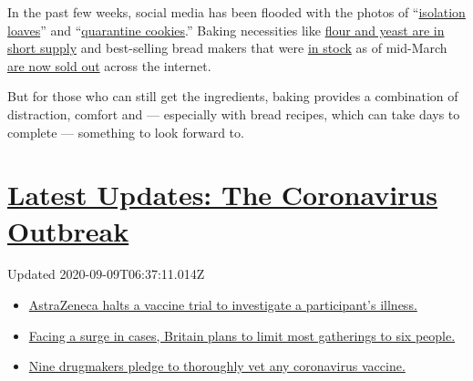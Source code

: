In the past few weeks, social media has been flooded with the photos of
``\href{https://www.instagram.com/henrycavill/?utm_source=ig_embed}{isolation
loaves}'' and
``\href{https://twitter.com/hashtag/quarantinecookies?src=hash}{quarantine
cookies}.'' Baking necessities like
\href{https://www.washingtonpost.com/news/voraciously/wp/2020/03/24/people-are-baking-bread-like-crazy-and-now-were-running-out-of-flour-and-yeast/}{flour
and yeast are in short supply} and best-selling bread makers that were
\href{https://mashable.com/shopping/march-17-bread-makers-on-sale-amazon-best-buy/}{in
stock} as of mid-March
\href{https://people.com/food/bread-makers-viral-amazon/}{are now sold
out} across the internet.

But for those who can still get the ingredients, baking provides a
combination of distraction, comfort and --- especially with bread
recipes, which can take days to complete --- something to look forward
to.

\hypertarget{latest-updates-the-coronavirus-outbreak}{%
\section{\texorpdfstring{\href{https://www.nytimes3xbfgragh.onion/2020/09/08/world/covid-19-coronavirus.html?action=click\&pgtype=Article\&state=default\&region=MAIN_CONTENT_1\&context=storylines_live_updates}{Latest
Updates: The Coronavirus
Outbreak}}{Latest Updates: The Coronavirus Outbreak}}\label{latest-updates-the-coronavirus-outbreak}}

Updated 2020-09-09T06:37:11.014Z

\begin{itemize}
\tightlist
\item
  \href{https://www.nytimes3xbfgragh.onion/2020/09/08/world/covid-19-coronavirus.html?action=click\&pgtype=Article\&state=default\&region=MAIN_CONTENT_1\&context=storylines_live_updates\#link-313b443d}{AstraZeneca
  halts a vaccine trial to investigate a participant's illness.}
\item
  \href{https://www.nytimes3xbfgragh.onion/2020/09/08/world/covid-19-coronavirus.html?action=click\&pgtype=Article\&state=default\&region=MAIN_CONTENT_1\&context=storylines_live_updates\#link-4438dd7}{Facing
  a surge in cases, Britain plans to limit most gatherings to six
  people.}
\item
  \href{https://www.nytimes3xbfgragh.onion/2020/09/08/world/covid-19-coronavirus.html?action=click\&pgtype=Article\&state=default\&region=MAIN_CONTENT_1\&context=storylines_live_updates\#link-679303d7}{Nine
  drugmakers pledge to thoroughly vet any coronavirus vaccine.}
\end{itemize}

